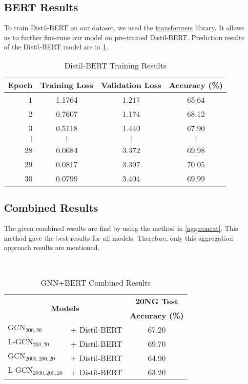 \subsection{BERT Results}
To train Distil-BERT on our dataset, we used the \href{https://huggingface.co/docs/transformers/index}{transformers} library. It allows us to further fine-tune our model on pre-trained Distil-BERT. Prediction results of the Distil-BERT model are in \cref{table:bert_results}.
\begin{table}[h]
    \centering
    \caption{Distil-BERT Training Results}\label{table:bert_results}
    \begin{tabular}{rccc}\toprule
        \textbf{Epoch} & \textbf{Training Loss} & \textbf{Validation Loss} & \textbf{Accuracy (\%)} \\ \midrule
        1 & 1.1764 & 1.217 & 65.64 \\ 
        2 & 0.7607 & 1.174 & 68.12 \\ 
        3 & 0.5118 & 1.440 & 67.90  \\
        $\vdots$ & $\vdots$ & $\vdots$ & $\vdots$ \\
        28 & 0.0684 & 3.372 & 69.98  \\ 
        29 & 0.0817 & 3.397 & 70.05   \\ 
        30 & 0.0799 & 3.404 & 69.99   \\ \bottomrule
    \end{tabular}
\end{table}
\subsection[Combined Results]{Combined \DOCEM{} Results}
The given combined results are find by using the method in \cref{agg:concat}. This method gave the best results for all models. Therefore, only this aggregation approach results are mentioned.
\begin{table}[h]
    \centering{}
    \caption{GNN+BERT Combined Results}~\label{tab:results:combined}
    \begin{tabular}{llc}\toprule
    \multicolumn{2}{c}{\multirow{2}{*}{\textbf{Models}}} & \textbf{20NG Test} \\
       & & \textbf{Accuracy (\%)} \\ \midrule
    $\text{GCN}_{200,20}$ & + Distil-BERT        & 67.20        \\
    $\text{L-GCN}_{200,20}$  & + Distil-BERT                 & 69.70        \\ 
    $\text{GCN}_{2000,200,20}$  & + Distil-BERT              & 64.90        \\ 
    $\text{L-GCN}_{2000,200,20}$  & + Distil-BERT            & 63.20        \\ 
       \bottomrule
    \end{tabular}
\end{table}

